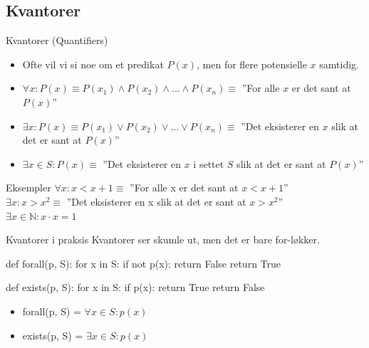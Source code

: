 \subsection{Kvantorer}
\begin{frame}{Kvantorer (Quantifiers)}
    \begin{itemize}
        \item Ofte vil vi si noe om et predikat $P(x)$, men for flere potensielle $x$ samtidig.
        \pause
        \item $\forall x : P(x) \equiv P(x_1) \land P(x_2) \land ... \land P(x_n) \equiv$ ''For alle $x$ er det sant at $P(x)$''
        \pause
        \item $\exists x : P(x) \equiv P(x_1) \lor P(x_2) \lor ... \lor P(x_n) \equiv$ ''Det eksisterer en $x$ slik at det er sant at $P(x)$''
        \pause
        \item $\exists x \in S : P(x) \equiv$ ''Det eksisterer en $x$ i settet $S$ slik at  det er sant at $P(x)$''
    \end{itemize}
    
    \pause

    \begin{block}{Eksempler}
        $\forall x : x < x + 1 \equiv$ ''For alle x er det sant at $x < x +1$''\\
        $\exists x : x > x^2 \equiv$ ''Det eksisterer en x slik at det er sant at $x > x^2$''\\
        $\exists x \in \mathbb{N} : x \cdot x = 1$\\
    \end{block}
\end{frame}

\begin{frame}[fragile]{Kvantorer i praksis}
    Kvantorer ser skumle ut, men det er bare for-løkker.
    \begin{python}
def forall(p, S):
    for x in S:
        if not p(x):
            return False
    return True
    
def exists(p, S):
    for x in S:
        if p(x):
            return True
    return False
    \end{python}
    
    \pause
    \begin{itemize}
        \item forall(p, S) = $\forall x \in S : p(x)$        
        \item exists(p, S) = $\exists x \in S : p(x)$
    \end{itemize}
\end{frame}

